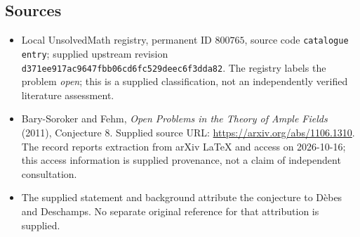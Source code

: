 \documentclass[11pt]{article}
\begin{document}
\subsection{Sources}
\begin{itemize}
\item Local UnsolvedMath registry, permanent ID \(800765\), source code \texttt{catalogue entry}; supplied upstream revision \texttt{d371ee917ac9647fbb06cd6fc529deec6f3dda82}. The registry labels the problem \emph{open}; this is a supplied classification, not an independently verified literature assessment.
\item Bary-Soroker and Fehm, \emph{Open Problems in the Theory of Ample Fields} (2011), Conjecture 8. Supplied source URL: \url{https://arxiv.org/abs/1106.1310}. The record reports extraction from arXiv LaTeX and access on 2026-10-16; this access information is supplied provenance, not a claim of independent consultation.
\item The supplied statement and background attribute the conjecture to D\`ebes and Deschamps. No separate original reference for that attribution is supplied.
\end{itemize}
\end{document}
